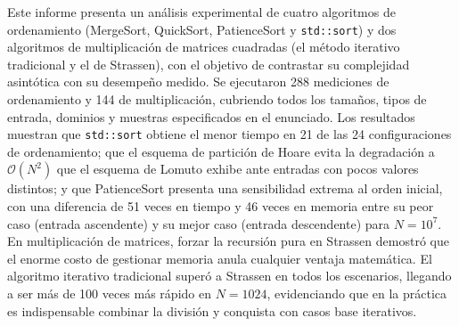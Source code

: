 Este informe presenta un análisis experimental de cuatro algoritmos de ordenamiento (MergeSort, QuickSort, PatienceSort y \texttt{std::sort}) y dos algoritmos de multiplicación de matrices cuadradas (el método iterativo tradicional y el de Strassen), con el objetivo de contrastar su complejidad asintótica con su desempeño medido. Se ejecutaron 288 mediciones de ordenamiento y 144 de multiplicación, cubriendo todos los tamaños, tipos de entrada, dominios y muestras especificados en el enunciado. Los resultados muestran que \texttt{std::sort} obtiene el menor tiempo en 21 de las 24 configuraciones de ordenamiento; que el esquema de partición de Hoare evita la degradación a $\mathcal{O}(N^2)$ que el esquema de Lomuto exhibe ante entradas con pocos valores distintos; y que PatienceSort presenta una sensibilidad extrema al orden inicial, con una diferencia de 51 veces en tiempo y 46 veces en memoria entre su peor caso (entrada ascendente) y su mejor caso (entrada descendente) para $N = 10^7$. En multiplicación de matrices, forzar la recursión pura en Strassen demostró que el enorme costo de gestionar memoria anula cualquier ventaja matemática. El algoritmo iterativo tradicional superó a Strassen en todos los escenarios, llegando a ser más de 100 veces más rápido en $N=1024$, evidenciando que en la práctica es indispensable combinar la división y conquista con casos base iterativos.
